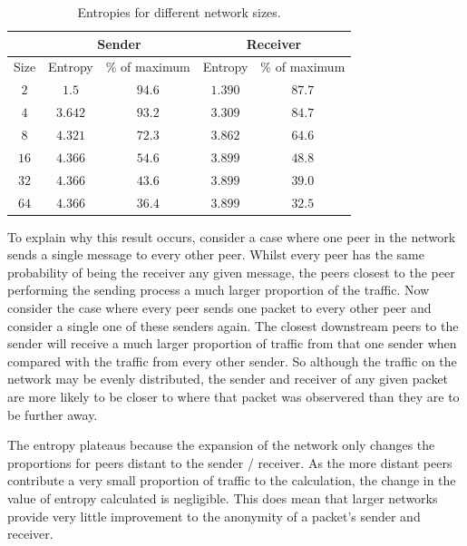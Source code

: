 \documentclass[ %
                    author={Luke Murray},
                supervisor={Dr. Simon Hollis},
                     title={Shadow Peer-to-Peer Networks},
                  subtitle={},
                    degree={MEng},
                      year={2013} ]{thesis}
\begin{document}

\begin{table}[t]
\centering
\begin{tabular}{|c|cc|cc|}
\hline
 & \multicolumn{2}{|c|}{Sender} & \multicolumn{2}{|c|}{Receiver} \\
\hline
Size & Entropy & \% of maximum & Entropy & \% of maximum \\
\hline
$2$ & $1.5$ & $94.6$ & $1.390$ & $87.7$\\
$4$ & $3.642$ & $93.2$ & $3.309$ & $84.7$\\
$8$ & $4.321$ & $72.3$ & $3.862$ & $64.6$\\
$16$ & $4.366$ & $54.6$ & $3.899$ & $48.8$\\
$32$ & $4.366$ & $43.6$ & $3.899$ & $39.0$\\
$64$ & $4.366$ & $36.4$ & $3.899$ & $32.5$\\
\hline
\end{tabular}
\caption{Entropies for different network sizes.}
\label{entropy_table}
\end{table}

To explain why this result occurs, consider a case where one peer in the network sends a single message to every other peer. Whilst every peer has the same probability of being the receiver any given message, the peers closest to the peer performing the sending process a much larger proportion of the traffic. Now consider the case where every peer sends one packet to every other peer and consider a single one of these senders again. The closest downstream peers to the sender will receive a much larger proportion of traffic from that one sender when compared with the traffic from every other sender. So although the traffic on the network may be evenly distributed, the sender and receiver of any given packet are more likely to be closer to where that packet was observered than they are to be further away.

The entropy plateaus because the expansion of the network only changes the proportions for peers distant to the sender / receiver. As the more distant peers contribute a very small proportion of traffic to the calculation, the change in the value of entropy calculated is negligible. This does mean that larger networks provide very little improvement to the anonymity of a packet's sender and receiver.
\end{document}
